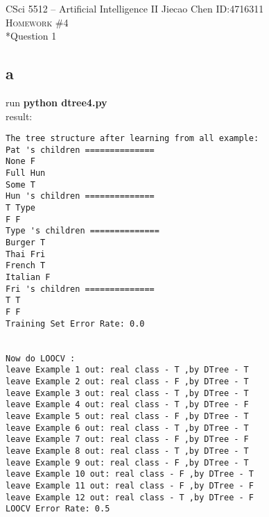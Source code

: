 \documentclass[12pt]{amsart}
\makeatletter
\renewcommand{\section}{\@startsection{section}{1}{0mm}
{-\baselineskip}{0.5\baselineskip}{\bf\leftline}}
\makeatother
\begin{document}
\noindent CSci 5512 -- Artificial Intelligence II \hfill Jiecao Chen \hfill ID:4716311 \\
\textsc{Homework \#4 }\\


\section*{Question 1} 
\subsection*{a}
run \textbf{python dtree4.py}\\
result:
\begin{verbatim}
The tree structure after learning from all example:
Pat 's children ==============
None F
Full Hun
Some T
Hun 's children ==============
T Type
F F
Type 's children ==============
Burger T
Thai Fri
French T
Italian F
Fri 's children ==============
T T
F F
Training Set Error Rate: 0.0


Now do LOOCV :
leave Example 1 out: real class - T ,by DTree - T
leave Example 2 out: real class - F ,by DTree - T
leave Example 3 out: real class - T ,by DTree - T
leave Example 4 out: real class - T ,by DTree - F
leave Example 5 out: real class - F ,by DTree - T
leave Example 6 out: real class - T ,by DTree - T
leave Example 7 out: real class - F ,by DTree - F
leave Example 8 out: real class - T ,by DTree - T
leave Example 9 out: real class - F ,by DTree - T
leave Example 10 out: real class - F ,by DTree - T
leave Example 11 out: real class - F ,by DTree - F
leave Example 12 out: real class - T ,by DTree - F
LOOCV Error Rate: 0.5
\end{verbatim}
\end{document}
